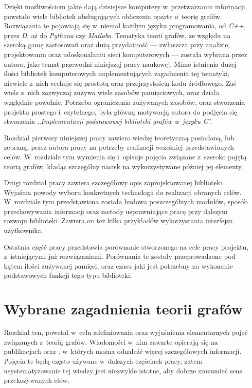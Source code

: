 \documentclass[a4paper,12pt,polish,twoside,openright]{thesis}
\begin{document}
Dzięki możliwościom jakie dają dzisiejsze komputery w~przetwarzaniu informacji, powstało wiele bibliotek obsługujących obliczenia oparte o~teorię grafów.
Rozwiązania te pojawiają się w~niemal każdym języku programowania, od \emph{C++}, przez \emph{D}, aż do \emph{Pythona} czy \emph{Matlaba}.
Tematyka teorii grafów, ze względu na szeroką gamę zastosowań oraz dużą przydatność --- zwłaszcza przy analizie, projektowaniu oraz udoskonalaniu sieci komputerowych --- została wybrana przez autora, jako temat przewodni niniejszej pracy naukowej.
Mimo istnienia dużej ilości bibliotek komputerowych implementujących zagadnienia tej tematyki, niewiele z~nich cechuje się prostotą oraz przejrzystością kodu źródłowego.
Zaś wiele z~nich zazwyczaj zużywa wiele zasobów pamięciowych, oraz działa względnie powolnie.
Potrzeba ograniczenia zużywanych zasobów, oraz stworzenia projektu prostego i~czytelnego, była główną motywacją autora do podjęcia się stworzenia ,,\emph{Implementacji podstawowej biblioteki grafów w~języku C}''.

Rozdział pierwszy niniejszej pracy zawiera wiedzę teoretyczną posiadaną, lub zebraną, przez autora pracy na potrzeby realizacji wcześniej przedstawionych celów.
W~rozdziale tym wymienia się i~opisuje pojęcia związane z~szeroko pojętą teorią grafów, kładąc szczególny nacisk na wykorzystywane później jej elementy.

Drugi rozdział pracy zawiera szczegółowy opis zaprojektowanej biblioteki.
Wyjaśnia powody wyboru konkretnych technologii do realizacji obranych celów.
W~rozdziale tym przedstawiona została budowa poszczególnych modułów, sposób przechowywania informacji oraz metody usprawniające pracę przy dalszym rozwoju biblioteki.
Zawiera on też kilka przykładów wykorzystania interfejsu użytkownika.

Ostatnia część pracy przedstawia porównanie stworzonego na cele pracy projektu, z~istniejącymi już rozwiązaniami.
Porównania te zostały przeprowadzone pod kątem ilości zużywanej pamięci, oraz czasu jaki jest potrzebny na wykonanie podstawowych funkcji tego typu biblioteki.


\chapter{Wybrane zagadnienia teorii grafów}
Rozdział ten, powstał w~celu zdefiniowania oraz wyjaśnienia elementarnych pojęć związanych z~teorią grafów. Wiadomości w~nim zawarte opierają się na publikacjach \cite{graphtheory} oraz \cite{graphtheory2}, w~których można odnaleźć więcej szczegółowych informacji.
Pojęcia te będą często używane w~dalszych częściach pracy, zatem usystematyzowanie tej wiedzy jest niezwykle istotne, aby dobrze zrozumieć sens przekazywanych słów.
\end{document}
